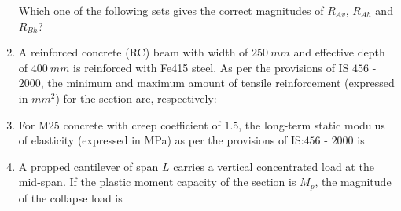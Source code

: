 \documentclass[journal]{IEEEtran}
\begin{document}
\begin{enumerate}[resume]
Which one of the following sets gives the correct magnitudes of $R_{Av}$, $R_{Ah}$ and $R_{Bh}$?
\begin{enumerate}
\end{enumerate}

\item A reinforced concrete (RC) beam with width of $250 \ mm$ and effective depth of $400 \ mm$ is reinforced with Fe415 steel. As per the provisions of IS $456$ - $2000$, the minimum and maximum amount of tensile reinforcement (expressed in $mm^2$) for the section are, respectively: \hfill {}
\begin{enumerate}
\end{enumerate}

\item For M25 concrete with creep coefficient of $1.5$, the long-term static modulus of elasticity (expressed in MPa) as per the provisions of IS:$456$ - $2000$ is  \hfill {}

\item A propped cantilever of span $L$ carries a vertical concentrated load at the mid-span. If the plastic moment capacity of the section is $M_p$, the magnitude of the collapse load is   \hfill {}
\begin{enumerate}
\end{enumerate}


\end{enumerate}
\end{document}
